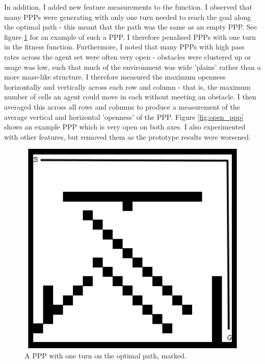 \documentclass[authoryearcitations]{UoYCSproject}
\begin{document}
In addition, I added new feature measurements to the function. I observed that many PPPs were generating with only one turn needed to reach the goal along the optimal path - this meant that the path was the same as an empty PPP. See figure \ref{fig:one_turn_ppp} for an example of such a PPP. I therefore penalised PPPs with one turn in the fitness function. Furthermore, I noted that many PPPs with high pass rates across the agent set were often very open - obstacles were clustered up or usage was low, such that much of the environment was wide 'plains' rather than a more maze-like structure. I therefore measured the maximum openness horizontally and vertically across each row and column - that is, the maximum number of cells an agent could move in each without meeting an obstacle. I then averaged this across all rows and columns to produce a measurement of the average vertical and horizontal 'openness' of the PPP. Figure \ref{fig:open_ppp} shows an example PPP which is very open on both axes. I also experimented with other features, but removed them as the prototype results were worsened.

\begin{figure}
\graphicspath{ {DesignImpPics/} }
\includegraphics[width=1\textwidth]{oneTurn.png}
\caption{ A PPP with one turn on the optimal path, marked.}
\label{fig:one_turn_ppp}
\end{figure}
\end{document}
